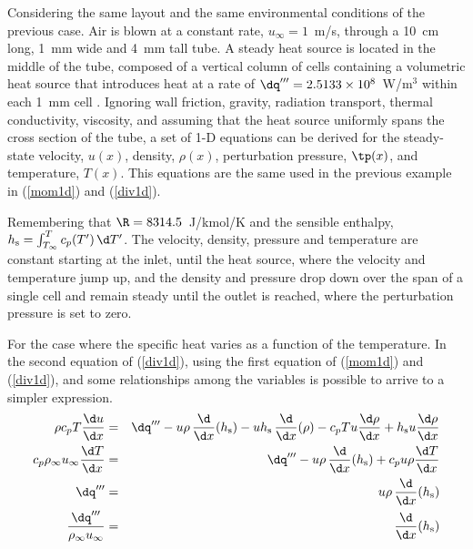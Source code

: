 \documentclass[11pt]{book}
\begin{document}
Considering the same layout and the same environmental conditions of the previous case. Air is blown at a constant rate, $u_\infty=1$~m/s, through a 10~cm long, 1~mm wide and 4~mm tall tube. A steady heat source is located in the middle of the tube, composed of a vertical column of cells containing a volumetric heat source that introduces heat at a rate of $\dq'''=2.5133 \times 10^8$~W/m$^3$ within each 1~mm cell . Ignoring wall friction, gravity, radiation transport, thermal conductivity, viscosity, and assuming that the heat source uniformly spans the cross section of the tube, a set of 1-D equations can be derived for the steady-state velocity, $u(x)$, density, $\rho(x)$, perturbation pressure, $\tp(x)$, and temperature, $T(x)$. This equations are the same used in the previous example in (\ref{mom1d}) and (\ref{div1d}).

Remembering that $\R=8314.5$~J/kmol/K and the sensible enthalpy, $h_{\rm s}=\int_{T_\infty}^T c_p(T') \, \d T'$. The velocity, density, pressure and temperature are constant starting at the inlet, until the heat source, where the velocity and temperature jump up, and the density and pressure drop down over the span of a single cell and remain steady until the outlet is reached, where the perturbation pressure is set to zero.

For the case where the specific heat varies as a function of the temperature. In the second equation of (\ref{div1d}), using the first equation of (\ref{mom1d}) and (\ref{div1d}), and some relationships among the variables is possible to arrive to a simpler expression.
\begin{eqnarray}
   \rho c_p T \frac{\d u}{\d x}  &=& \dq''' - u \rho \, \frac{\d}{\d x} (h_{\rm s}) - u h_{\rm s} \, \frac{\d}{\d x} (\rho) - c_p T u \frac{\d \rho}{\d x}  + h_{\rm s} u \frac{\d \rho}{\d x} \\
   c_p \rho_\infty u_\infty \frac{\d T}{\d x} &=& \dq'''  - u \rho \, \frac{\d}{\d x} (h_{\rm s}) + c_p u \rho \frac{\d T}{\d x}  \\
  \dq''' &=&   u \rho \, \frac{\d}{\d x} (h_{\rm s}) \\
  \frac{ \dq'''}{\rho_\infty u_\infty} &=&  \frac{\d}{\d x} (h_{\rm s})  \label{1stLaw}
\end{eqnarray}
\end{document}
